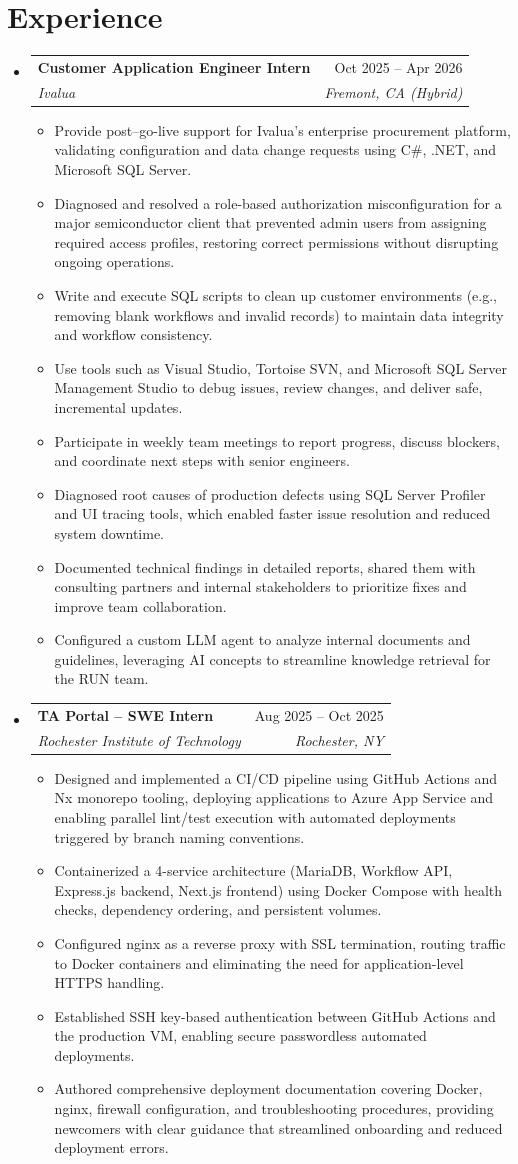 \documentclass[letterpaper,11pt]{article}
\makeatletter
\newcommand{\resumeItem}[1]{
  \item\small{
    {#1 \vspace{-2pt}}
  }
}
\newcommand{\resumeSubheading}[4]{
  \vspace{-2pt}\item
    \begin{tabular*}{0.97\textwidth}[t]{l@{\extracolsep{\fill}}r}
      \textbf{#1} & #2 \\
      \textit{\small#3} & \textit{\small #4} \\
    \end{tabular*}\vspace{-7pt}
}
\newcommand{\resumeSubHeadingListStart}{\begin{itemize}[leftmargin=0.15in, label={}]}
\newcommand{\resumeSubHeadingListEnd}{\end{itemize}}
\newcommand{\resumeItemListStart}{\begin{itemize}}
\newcommand{\resumeItemListEnd}{\end{itemize}\vspace{-5pt}}
\makeatother
\begin{document}
\section{Experience}
  \resumeSubHeadingListStart
    \resumeSubheading
      {Customer Application Engineer Intern}{Oct 2025 -- Apr 2026}
      {Ivalua}{Fremont, CA (Hybrid)}
      \resumeItemListStart
        \resumeItem{Provide post–go-live support for Ivalua's enterprise procurement platform, validating configuration and data change requests using C\#, .NET, and Microsoft SQL Server.}
        \resumeItem{Diagnosed and resolved a role-based authorization misconfiguration for a major semiconductor client that prevented admin users from assigning required access profiles, restoring correct permissions without disrupting ongoing operations.}
        \resumeItem{Write and execute SQL scripts to clean up customer environments (e.g., removing blank workflows and invalid records) to maintain data integrity and workflow consistency.}
        \resumeItem{Use tools such as Visual Studio, Tortoise SVN, and Microsoft SQL Server Management Studio to debug issues, review changes, and deliver safe, incremental updates.}
        \resumeItem{Participate in weekly team meetings to report progress, discuss blockers, and coordinate next steps with senior engineers.}
        \resumeItem{Diagnosed root causes of production defects using SQL Server Profiler and UI tracing tools, which enabled faster issue resolution and reduced system downtime.}
        \resumeItem{Documented technical findings in detailed reports, shared them with consulting partners and internal stakeholders to prioritize fixes and improve team collaboration.}
        \resumeItem{Configured a custom LLM agent to analyze internal documents and guidelines, leveraging AI concepts to streamline knowledge retrieval for the RUN team.}
      \resumeItemListEnd

    \resumeSubheading
      {TA Portal -- SWE Intern}{Aug 2025 -- Oct 2025}
      {Rochester Institute of Technology}{Rochester, NY}
      \resumeItemListStart
        \resumeItem{Designed and implemented a CI/CD pipeline using GitHub Actions and Nx monorepo tooling, deploying applications to Azure App Service and enabling parallel lint/test execution with automated deployments triggered by branch naming conventions.}
        \resumeItem{Containerized a 4-service architecture (MariaDB, Workflow API, Express.js backend, Next.js frontend) using Docker Compose with health checks, dependency ordering, and persistent volumes.}
        \resumeItem{Configured nginx as a reverse proxy with SSL termination, routing traffic to Docker containers and eliminating the need for application-level HTTPS handling.}
        \resumeItem{Established SSH key-based authentication between GitHub Actions and the production VM, enabling secure passwordless automated deployments.}
        \resumeItem{Authored comprehensive deployment documentation covering Docker, nginx, firewall configuration, and troubleshooting procedures, providing newcomers with clear guidance that streamlined onboarding and reduced deployment errors.}
      \resumeItemListEnd
  \resumeSubHeadingListEnd
\end{document}

